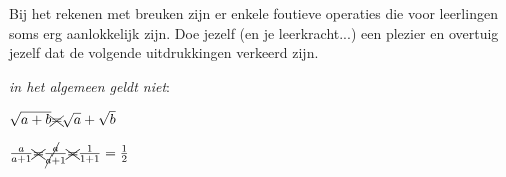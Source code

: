 \documentclass{ximera}
\begin{document}
Bij het rekenen met breuken zijn er enkele foutieve operaties die voor leerlingen soms erg aanlokkelijk zijn. 
Doe jezelf (en je leerkracht...) een plezier en overtuig jezelf dat de volgende uitdrukkingen verkeerd zijn. 

\begin{remark}
    \textit{in het algemeen geldt niet}:
    
    \renewcommand\CancelColor{\color{red}}
    
    
      $ \sqrt{a+b} \xcancel{=} \sqrt{a} + \sqrt{b}$ 
    
    
    $ \frac{a}{a+1} \xcancel{=} \frac{\cancel{a}}{\cancel{a}+1}  \xcancel{=} \frac{1}{1+1} = \frac{1}{2} $
    
    \end{remark}
\end{document}
